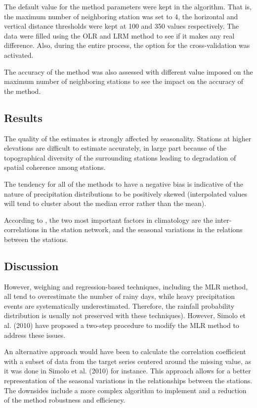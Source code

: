 \documentclass[TechnicalNoteMeteo.tex]{subfiles}
\begin{document}
The default value for the method parameters were kept in the algorithm. That is, the maximum number of neighboring station was set to 4, the horizontal and vertical distance thresholds were kept at 100 and 350 values respectively. The data were filled using the OLR and LRM method to see if it makes any real difference. Also, during the entire process, the option for the cross-validation was activated.

The accuracy of the method was also assessed with different value imposed on the maximum number of neighboring stations to see the impact on the accuracy of the method.

\subsection{Results}

The quality of the estimates is strongly affected by seasonality. Stations at higher elevations are difficult to estimate accurately, in large part because of the topographical diversity of the surrounding stations leading to degradation of spatial coherence among stations.

The tendency for all of the methods to have a negative bias is indicative of the nature of precipitation distributions to be positively skewed (interpolated values will tend to cluster about the median error rather than the mean).

According to \cite{xia_forest_1999}, the two most important factors in climatology are the inter-correlations in the station network, and the seasonal variations in the relations between the stations.

\subsection{Discussion}

However, weighing and regression-based techniques, including the MLR method, all tend to overestimate the number of rainy days, while heavy precipitation events are systematically underestimated. Therefore, the rainfall probability distribution is usually not preserved with these techniques). However, Simolo et al. (2010) have proposed a two-step procedure to modify the MLR method to address these issues.

An alternative approach would have been to calculate the correlation coefficient with a subset of data from the target series centered around the missing value, as it was done in Simolo et al. (2010) for instance. This approach allows for a better representation of the seasonal variations in the relationships between the stations. The downsides include a more complex algorithm to implement and a reduction of the method robustness and efficiency.
\end{document}
